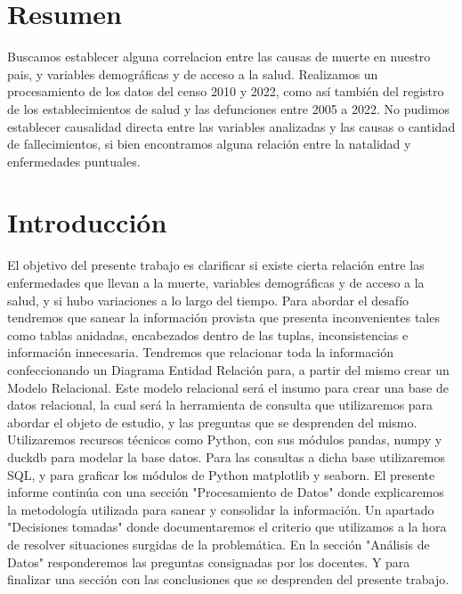 \documentclass[11pt,a4paper]{article}
\begin{document}
\maketitle
\section*{Resumen}
Buscamos establecer alguna correlacion entre las causas de muerte en nuestro pais, y variables demográficas y de acceso a la salud.
Realizamos un procesamiento de los datos del censo 2010 y 2022, como así también del registro de los establecimientos de salud y las defunciones entre 2005 a 2022.
No pudimos establecer causalidad directa entre las variables analizadas y las causas o cantidad de fallecimientos, si bien encontramos alguna relación entre
la natalidad y enfermedades puntuales.



\section*{Introducción}
El objetivo del presente trabajo es clarificar si existe cierta relación entre las enfermedades que llevan a la muerte, variables
demográficas y de acceso a la salud, y si hubo variaciones a lo largo del tiempo. Para abordar el desafío tendremos que sanear la información provista que presenta inconvenientes tales como tablas anidadas, encabezados dentro de las tuplas, inconsistencias e información innecesaria. Tendremos que relacionar toda la información confeccionando un Diagrama Entidad Relación para, a partir del mismo crear un Modelo Relacional. Este modelo relacional será el insumo para crear una base de datos relacional, la cual será la herramienta de consulta que utilizaremos para abordar el objeto de estudio, y las preguntas que se desprenden del mismo. Utilizaremos recursos técnicos como Python, con sus módulos pandas, numpy y duckdb para modelar la base datos. Para las consultas a dicha base utilizaremos SQL, y para graficar los módulos de Python matplotlib y seaborn. El presente informe continúa con una sección "Procesamiento de Datos" donde explicaremos la metodología utilizada para sanear y consolidar la información. Un apartado "Decisiones tomadas" donde documentaremos el criterio que utilizamos a la hora de resolver situaciones surgidas de la problemática. En la sección "Análisis de Datos" responderemos las preguntas consignadas por los docentes. Y para finalizar una sección con las conclusiones que se desprenden del presente trabajo.
\newpage
\end{document}
